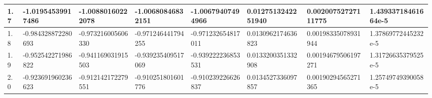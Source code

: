 \documentclass[12pt,b4paper,landscape]{memoir}
\begin{document}
\begin{table}[]
\begin{tabular}{|l|l|l|l|l|l|l|l|}
1.7                                                      & -1.01954539917486            & \multicolumn{1}{l|}{-1.00880160222078}  & -1.00680846832151       & -1.00679407494966  & 0.0127513242251940   & 0.00200752727111775           & 1.43933718461664e-5           \\ \hline
1.8                                                      & -0.984328872280693           & \multicolumn{1}{l|}{-0.973216005606330} & -0.971246441794255      & -0.971232654817011 & 0.0130962174636823   & 0.00198335078931944           & 1.37869772445232e-5           \\ \hline
1.9                                                      & -0.952542271986822           & \multicolumn{1}{l|}{-0.941169031915503} & -0.939235409517069      & -0.939222236853531 & 0.0133200351332908   & 0.00194679506197271           & 1.31726635379525e-5           \\ \hline
2.0                                                      & -0.923691960236623           & \multicolumn{1}{l|}{-0.912142172279551} & -0.910251801601776      & -0.910239226626837 & 0.0134527336097857   & 0.00190294565271365           & 1.25749749390058e-5           \\ \hline
\end{tabular}
\end{table}
\end{document}
